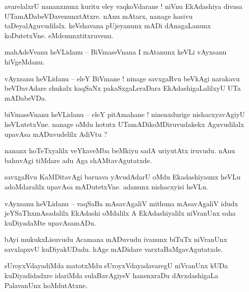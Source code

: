 \documentclass{article}
\begin{document}
\begin{mn}%
avarelalxrU nananxnunx kuritu eley vaqkoVdarane ! niVnu EkAdashiya divasa UTamADabeVDavenunxtAtxre. 
nAnu mAtarx, nanage hasivu taDeyalAguvudilalx. keVshavana pUjeyanunx mADi dAnagaLanunx 
koDutetxVne. eMdenunxtitxruvenu.
\end{mn}

\begin{mn}%
mahAdeVvanu heVLidanu -- BiVmaseVnana I mAtanunx keVLi vAyxsanu hiVgeMdanu.
\end{mn}

\begin{mn}%
vAyxsanu heVLidanu -- eleY BiVmane ! ninage savxgaRvu beVkAgi narakavu beVDavAdare shukalx kaqSaNx 
pakaSxgaLeraDara EkAdashigaLalilxyU UTa mADabeVDa.
\end{mn}

\begin{mn}%
biVmaseVnanu heVLidanu -- eleY pitAmahane ! ninenxdurige nishacxyavAgiyU heVLutetxVne. nanage oMdu 
hotutx UTamADikoMDiruvudakekx Aguvudilalx upavAsa mADuvudelilx AdiVtu ?
\end{mn}

\begin{mn}%
nananx hoTeTxyalilx veYkaveMba beMkiyu sadA uriyutAtx iruvudu. nAnu bahuvAgi tiMdare adu Aga 
shAMtavAgutatxde.
\end{mn}

\begin{mn}%
savxgaRvu KaMDitavAgi baruava yAvudAdarU oMdu Ekadashiyaunx heVLu adoMdaralilx upavAsa mADutetxVne.
adanunx nishacxyisi heVLu.
\end{mn}

\begin{mn}%
vAyxsanu heVLidanu -- vaqSaBa mAsavAgaliV mithuna mAsavAgaliV idudx jeYSaThxmAsadalilx EkAdashi 
oMdalilx A EkAdashiyalilx niVranUnx saha kuDiyadaMte upavAsamADu.
\end{mn}

\begin{mn}%
bAyi mukukxLisuvudu Acamana mADuvudu ivanunx biTuTx niVranUnx savxlapxvU kuDiyakUDadu. hAge 
mADidare varxtaBaMgavAgutatxde.
\end{mn}

\begin{mn}%
sUroyxVdayadiMda matotxMdu sUroyxVdayadavaregU niVranUnx kUDa kuDiyadidadxre idariMda sulaBavAgiyeV 
hanenxraDu dAvxdashigaLa PalavanUnx hoMdutAtxne.
\end{mn}
\end{document}
